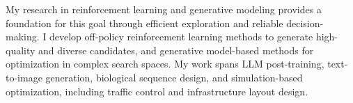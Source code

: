 \documentclass[10pt]{developercv} %
\begin{document}
My research in reinforcement learning and generative modeling provides a foundation for this goal through efficient exploration and reliable decision-making. I develop off-policy reinforcement learning methods to generate high-quality and diverse candidates, and generative model-based methods for optimization in complex search spaces. My work spans LLM post-training, text-to-image generation, biological sequence design, and simulation-based optimization, including traffic control and infrastructure layout design.


\end{document}
